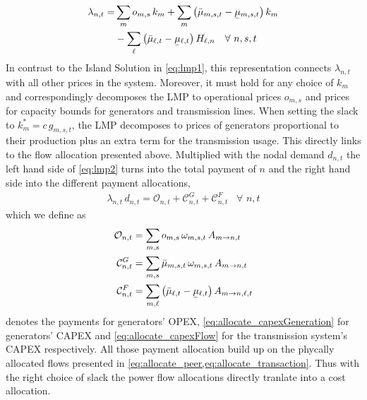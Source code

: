 \documentclass[11pt,twocolumn]{article}
\newcommand{\ubar}[1]{\underaccent{\bar}{#1}}
\newcommand{\generation}[1][n]{g_{#1,s,t}}
\newcommand{\generationshare}[1][n]{\omega_{#1,s,t}}
\newcommand{\opexGeneration}[1][n]{o_{#1,s}}
\newcommand{\nodaldemand}[1][n]{d_{#1,t}}
\newcommand{\ptdf}[1][n]{H_{\ell,#1}}
\newcommand{\slack}[1][n]{k_{#1}}
\newcommand{\slackk}[1][n]{k^*_{#1}}
\newcommand{\mulowergeneration}[1][n]{\ubar{\mu}_{#1,s,t}}
\newcommand{\muuppergeneration}[1][n]{\bar{\mu}_{#1,s,t}}
\newcommand{\mulowerflow}{\ubar{\mu}_{\ell,t}}
\newcommand{\muupperflow}{\bar{\mu}_{\ell,t}}
\newcommand{\lmp}[1][n]{\lambda_{#1,t}}
\newcommand{\allocatePeer}[1][m \rightarrow n]{A_{#1,t}}
\newcommand{\allocateTransaction}[1][m \rightarrow n]{A_{#1,\ell,t}}
\newcommand{\allocateCapexGeneration}[1][n]{\mathcal{C}^{G}_{#1,t}}
\newcommand{\allocateCapexFlow}[1][n]{\mathcal{C}^{F}_{#1,t}}
\newcommand{\allocateOpex}[1][n]{\mathcal{O}_{#1,t}}
\newcommand{\Forall}[1]{\hspace{10pt} \forall \,\, #1 }
\begin{document}
\begin{align}
\notag
\lmp =&  \sum_m \opexGeneration[m]\, \slack[m]  + \sum_m \left( \muuppergeneration[m] - \mulowergeneration[m] \right) \slack[m] \\
& -\sum_\ell \left( \muupperflow - \mulowerflow\right) \ptdf  \Forall{n,s,t} 
\label{eq:lmp2}
\end{align}
%  
In contrast to the Island Solution in \cref{eq:lmp1}, this representation connects $\lmp$ with all other prices in the system. Moreover, it must hold for any choice of $\slack[m]$ and correspondingly decomposes the LMP to operational prices $\opexGeneration[m]$ and prices for capacity bounds for generators and transmission lines. When setting the slack to $\slackk[m] = c \, \generation[m]$, the LMP decomposes to prices of generators proportional to their production plus an extra term for the transmission usage. This directly links to the flow allocation presented above. Multiplied with the nodal demand $\nodaldemand$ the left hand side of \cref{eq:lmp2} turns into the total payment of $n$ and the right hand side into the different payment allocations, 
\begin{align}
\lmp \, \nodaldemand = \allocateOpex + \allocateCapexGeneration + \allocateCapexFlow \Forall{n,t}
\label{eq:lmp_allocation}
\end{align}
which we define as  
\begin{align}
\allocateOpex &= 
\sum_{m,s} \opexGeneration[m] \, \generationshare[m] \, \allocatePeer 
\label{eq:allocate_opexGeneration}\\
\allocateCapexGeneration &= 
\sum_{m,s} \muuppergeneration[m] \, \generationshare[m] \, \allocatePeer
\label{eq:allocate_capexGeneration} \\
\allocateCapexFlow &=  
\sum_{m,\ell} \left( \muupperflow - \mulowerflow\right) \allocateTransaction  
\label{eq:allocate_capexFlow}
\end{align}
 denotes the payments for generators' OPEX, \cref{eq:allocate_capexGeneration} for generators' CAPEX and \cref{eq:allocate_capexFlow} for the transmission system's CAPEX respectively. All those payment allocation build up on the phycally allocated flows presented in \cref{eq:allocate_peer,eq:allocate_transaction}. Thus with the right choice of slack the power flow allocations directly tranlate into a cost allocation.
\end{document}
